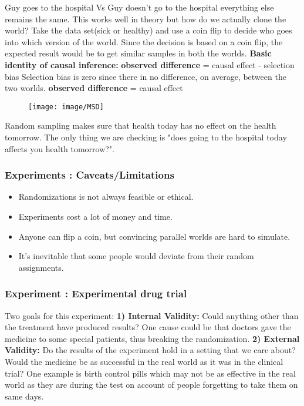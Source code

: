 Guy goes to the hospital Vs Guy doesn't go to the hospital everything else remains the same. \newline
This works well in theory but how do we actually clone the world? \newline
Take the data set(sick or healthy) and use a coin flip to decide who goes into which version of the world.
Since the decision is based on a coin flip, the expected result would be to get similar samples in both the worlds.\newline
\textbf{Basic identity of causal inference:} \newline
\textbf{observed difference} = causal effect - selection bias \newline
Selection bias is zero since there in no difference, on average, between the two worlds.\newline
\textbf{observed difference} = causal effect

\begin{figure}
	\texttt{[image: image/MSD]}
\end{figure}

Random sampling makes sure that health today has no effect on the health tomorrow.
The only thing we are checking is "does going to the hospital today affects you health tomorrow?".

\subsubsection{Experiments : Caveats/Limitations}
\begin{itemize}
\item Randomizations is not always feasible or ethical.
\item Experiments cost a lot of money and time.
\item Anyone can flip a coin, but convincing parallel worlds are hard to simulate.
\item It's inevitable that some people would deviate from their random assignments.
\end{itemize}

\subsubsection{Experiment : Experimental drug trial}
Two goals for this experiment:\newline
\textbf{1) Internal Validity:}
Could anything other than the treatment have produced results?\newline
One cause could be that doctors gave the medicine to some special patients, thus breaking the randomization. \newline
\textbf{2) External Validity:}
Do the results of the experiment hold in a setting that we care about? \newline
Would the medicine be as successful in the real world as it was in the clinical trial? \newline
One example is birth control pills which may not be as effective in the real world as they are during the test on account of people forgetting to take them on same days.

